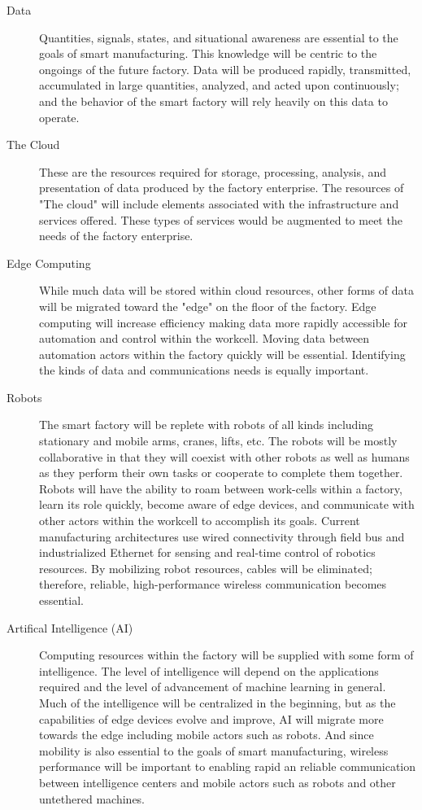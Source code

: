 \begin{description}
	
	\item[Data] Quantities, signals, states, and situational awareness are essential to the goals of smart manufacturing. This knowledge will be centric to the ongoings of the future factory.  Data will be produced rapidly, transmitted, accumulated in large quantities, analyzed, and acted upon continuously; and the behavior of the smart factory will rely heavily on this data to operate. 
	 
	\item[The Cloud] These are the resources required for storage, processing, analysis, and presentation of data produced by the factory enterprise.  The resources of "The cloud" will include elements associated with the infrastructure and services offered.  These types of services would be augmented to meet the needs of the factory enterprise.
	
	\item[Edge Computing]  While much data will be stored within cloud resources, other forms of data will be migrated toward the "edge" on the floor of the factory.  Edge computing will increase efficiency making data more rapidly accessible for automation and control within the workcell.  Moving data between automation actors within the factory quickly will be essential.  Identifying the kinds of data and communications needs is equally important.
	
	\item[Robots] The smart factory will be replete with robots of all kinds including stationary and mobile arms, cranes, lifts, etc.  The robots will be mostly collaborative in that they will coexist with other robots as well as humans as they perform their own tasks or cooperate to complete them together.  Robots will have the ability to roam between work-cells within a factory, learn its role quickly, become aware of edge devices, and communicate with other actors within the workcell to accomplish its goals.  Current manufacturing architectures use wired connectivity through field bus and industrialized Ethernet for sensing and real-time control of robotics resources. By mobilizing robot resources, cables will be eliminated; therefore, reliable, high-performance wireless communication becomes essential.
	
	\item[Artifical Intelligence (AI)] Computing resources within the factory will be supplied with some form of intelligence.  The level of intelligence will depend on the applications required and the level of advancement of machine learning in general.  Much of the intelligence will be centralized in the beginning, but as the capabilities of edge devices evolve and improve, AI will migrate more towards the edge including mobile actors such as robots.   And since mobility is also essential to the goals of smart manufacturing, wireless performance will be important to enabling rapid an reliable communication between intelligence centers and mobile actors such as robots and other untethered machines.
	

\end{description}
